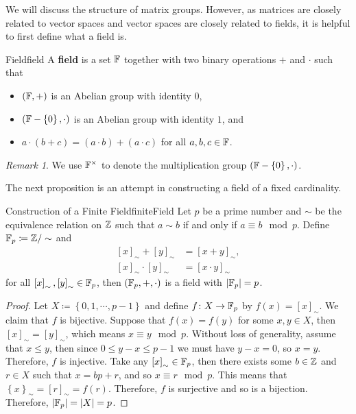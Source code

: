 \documentclass[math]{amznotes}
\theoremstyle{remark}
\newtheorem*{remark}{Remark}
\newcommand{\0}{\mathbf{0}}
\newcommand{\1}{\mathbf{1}}
\begin{document}
We will discuss the structure of matrix groups. However, as matrices are closely related to vector spaces and vector spaces are closely related to fields, it is helpful to first define what a field is.
\begin{dfnbox}{Field}{field}
    A {\color{red} \textbf{field}} is a set $\mathbb{F}$ together with two binary operations $+$ and $\cdot$ such that 
    \begin{itemize}
        \item $\left(\mathbb{F}, +\right)$ is an Abelian group with identity $0$,
        \item $\left(\mathbb{F} - \left\{0\right\}, \cdot\right)$ is an Abelian group with identity $1$, and
        \item $a \cdot \left(b + c\right) = \left(a \cdot b\right) + \left(a \cdot c\right)$ for all $a, b, c \in \mathbb{F}$.
    \end{itemize}
\end{dfnbox}
\begin{notebox}
    \begin{remark}
        We use $\mathbb{F}^{\times}$ to denote the multiplication group $\left(\mathbb{F} - \left\{0\right\}, \cdot\right)$.
    \end{remark}
\end{notebox}
The next proposition is an attempt in constructing a field of a fixed cardinality. 
\begin{probox}{Construction of a Finite Field}{finiteField}
    Let $p$ be a prime number and $\sim$ be the equivalence relation on $\mathbb{Z}$ such that $a \sim b$ if and only if $a \equiv b \mod p$. Define $\mathbb{F}_p \coloneqq \mathbb{Z} / \sim$ and 
    \begin{align*}
        \left[x\right]_{\sim} + \left[y\right]_{\sim} & = \left[x + y\right]_{\sim}, \\
        \left[x\right]_{\sim} \cdot \left[y\right]_{\sim} & = \left[x \cdot y\right]_{\sim}
    \end{align*}
    for all $\left[x\right]_{\sim}, \left[y\right]_{\sim} \in \mathbb{F}_p$, then $\left(\mathbb{F}_p, +, \cdot\right)$ is a field with ${\left\lvert {\mathbb{F}_p} \right\rvert} = p$.
    \tcblower
    \begin{proof}
        Let $X \coloneqq \left\{0, 1, \cdots, p - 1\right\}$ and define $f \colon X \to \mathbb{F}_p$ by $f\left(x\right) = \left[x\right]_{\sim}$. We claim that $f$ is bijective. Suppose that $f\left(x\right) = f\left(y\right)$ for some $x, y \in X$, then $\left[x\right]_{\sim} = \left[y\right]_{\sim}$, which means $x \equiv y \mod p$. Without loss of generality, assume that $x \leq y$, then since $0 \leq y - x \leq p - 1$ we must have $y - x = 0$, so $x = y$. Therefore, $f$ is injective. Take any $\left[x\right]_{\sim} \in \mathbb{F}_p$, then there exists some $b \in \mathbb{Z}$ and $r \in X$ such that $x = bp + r$, and so $x \equiv r \mod p$. This means that $\left\{x\right\}_{\sim} = \left[r\right]_{\sim} = f\left(r\right)$. Therefore, $f$ is surjective and so is a bijection. Therefore, ${\left\lvert {\mathbb{F}_p} \right\rvert} = {\left\lvert {X} \right\rvert} = p$.
    \end{proof}
\end{probox}
\end{document}
